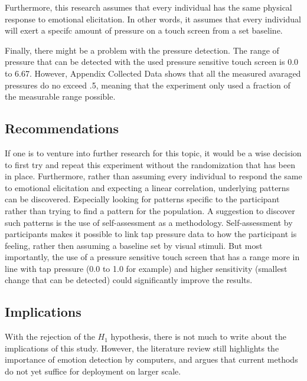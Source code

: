 \documentclass{sigchi}
\begin{document}
Furthermore, this research assumes that every individual has the same physical response to emotional elicitation. In other words, it assumes that every individual will exert a specifc amount of pressure on a touch screen from a set baseline.

Finally, there might be a problem with the pressure detection. The range of pressure that can be detected with the used pressure sensitive touch screen is 0.0 to 6.67. However, Appendix Collected Data shows that all the measured avaraged pressures do no exceed .5, meaning that the experiment only used a fraction of the measurable range possible.

\subsection{Recommendations} %
\label{sub:recommendations}
If one is to venture into further research for this topic, it would be a wise decision to first try and repeat this experiment without the randomization that has been in place. Furthermore, rather than assuming every individual to respond the same to emotional elicitation and expecting a linear correlation, underlying patterns can be discovered. Especially looking for patterns specific to the participant rather than trying to find a pattern for the population. A suggestion to discover such patterns is the use of self-assessment as a methodology. Self-assessment by participants makes it possible to link tap pressure data to how the participant is feeling, rather then assuming a baseline set by visual stimuli. But most importantly, the use of a pressure sensitive touch screen that has a range more in line with tap pressure (0.0 to 1.0 for example) and higher sensitivity (smallest change that can be detected) could significantly improve the results.

\subsection{Implications} %
\label{sub:implications}
With the rejection of the $H_1$ hypothesis, there is not much to write about the implications of this study. However, the literature review still highlights the importance of emotion detection by computers, and argues that current methods do not yet suffice for deployment on larger scale. 

\end{document}
